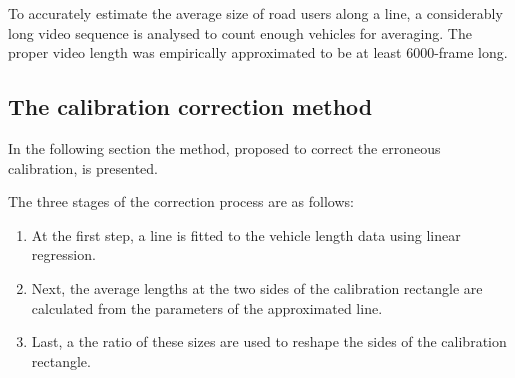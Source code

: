 To accurately estimate the average size of road users along a line, a considerably long video sequence is analysed to count enough vehicles for averaging.
The proper video length was empirically approximated to be at least 6000-frame long.

\subsection{The calibration correction method}
In the following section the method, proposed to correct the erroneous calibration, is presented.

The three stages of the correction process are as follows:
\begin{enumerate}
\item At the first step, a line is fitted to the vehicle length data using linear regression.
\item Next, the average lengths at the two sides of the calibration rectangle are calculated from the parameters of the approximated line.
\item Last, a the ratio of these sizes are used to reshape the sides of the calibration rectangle.
\end{enumerate}


